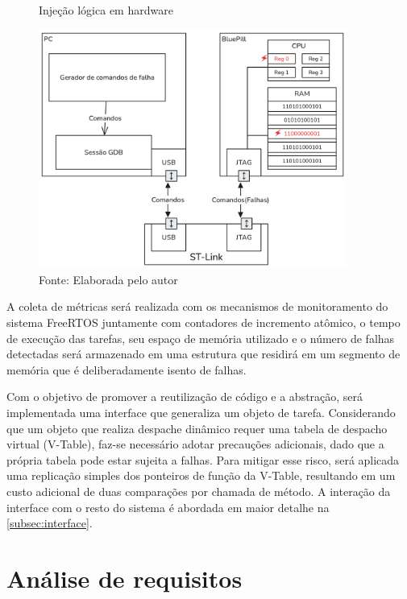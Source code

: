 \begin{figure}[H]
   \centering
   \captionsetup{justification=centering}
   \caption{Injeção lógica em hardware}
   \includegraphics[width=0.90\textwidth]{assets/injecao_hardware.png}
   \captionsetup{justification=raggedright}
  \caption*{Fonte: Elaborada pelo autor}
   \label{fig:injecaoHardwareLogica}
\end{figure}

A coleta de métricas será realizada com os mecanismos de monitoramento do sistema FreeRTOS juntamente com contadores de incremento atômico, o tempo de execução das tarefas, seu espaço de memória utilizado e o número de falhas detectadas será armazenado em uma estrutura que residirá em um segmento de memória que é deliberadamente isento de falhas.

Com o objetivo de promover a reutilização de código e a abstração, será implementada uma interface que generaliza um objeto de tarefa. Considerando que um objeto que realiza despache dinâmico requer uma tabela de despacho virtual (V-Table), faz-se necessário adotar precauções adicionais, dado que a própria tabela pode estar sujeita a falhas. Para mitigar esse risco, será aplicada uma replicação simples dos ponteiros de função da V-Table, resultando em um custo adicional de duas comparações por chamada de método. A interação da interface com o resto do sistema é abordada em maior detalhe na \autoref{subsec:interface}.

\section{Análise de requisitos}
\label{sec:req}

